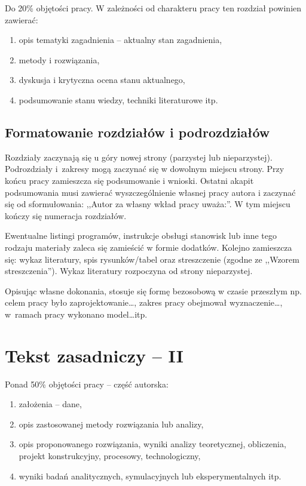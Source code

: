 \documentclass[12pt,twoside,openright]{article}
\begin{document}
Do 20\% objętości pracy. W zależności od charakteru pracy ten rozdział powinien zawierać:
\begin{enumerate}[label=\alph*), leftmargin=1.25cm]
	\item opis tematyki zagadnienia -- aktualny stan zagadnienia,
	\item metody i rozwiązania,
	\item dyskusja i krytyczna ocena stanu aktualnego,
	\item podsumowanie stanu wiedzy, techniki literaturowe itp.
\end{enumerate}

\subsection{Formatowanie rozdziałów i podrozdziałów}
Rozdziały zaczynają się u góry nowej strony (parzystej lub nieparzystej).
Podrozdziały i~zakresy mogą zaczynać się w dowolnym miejscu strony.
Przy końcu pracy zamieszcza się podsumowanie i wnioski. Ostatni akapit podsumowania musi zawierać wyszczególnienie własnej pracy autora i zaczynać się od sformułowania: ,,Autor za własny wkład pracy uważa:''.
W tym miejscu kończy się numeracja rozdziałów.

Ewentualne listingi programów, instrukcje obsługi stanowisk lub inne tego rodzaju materiały zaleca się zamieścić w formie dodatków.
Kolejno zamieszcza się: wykaz literatury, spis rysunków/tabel oraz streszczenie (zgodne ze ,,Wzorem streszczenia'').
Wykaz literatury rozpoczyna od strony nieparzystej.

Opisując własne dokonania, stosuje się formę bezosobową w czasie przeszłym np. celem pracy było zaprojektowanie\ldots, zakres pracy obejmował wyznaczenie\ldots, w~ramach pracy wykonano model\ldots itp.

\section{Tekst zasadniczy -- II}

Ponad 50\% objętości pracy -- część autorska:
\begin{enumerate}[label=\alph*), leftmargin=1.25cm] 
	\item założenia -- dane,
	\item opis zastosowanej metody rozwiązania lub analizy,
	\item opis proponowanego rozwiązania, wyniki analizy teoretycznej, obliczenia, projekt konstrukcyjny, procesowy, technologiczny,
	\item wyniki badań analitycznych, symulacyjnych lub eksperymentalnych itp.
\end{enumerate}
\end{document}
